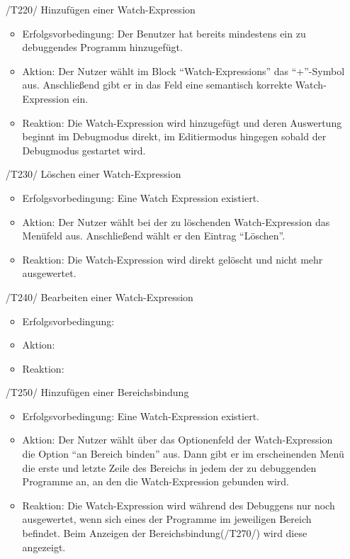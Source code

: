 \documentclass[parskip=full]{scrartcl}
\begin{document}
\begin{itemize}

	\item[/T220/] Hinzufügen einer \gls{Watch-Expression}
		\begin{itemize}
		\item Erfolgsvorbedingung: Der Benutzer hat bereits mindestens ein zu debuggendes Programm hinzugefügt.
		\item Aktion: Der Nutzer wählt im Block \enquote{Watch-Expressions} das \enquote{+}-Symbol aus. Anschließend gibt er in das Feld eine semantisch korrekte Watch-Expression ein.
		\item Reaktion:	Die Watch-Expression wird hinzugefügt und deren Auswertung beginnt im Debugmodus direkt, im Editiermodus hingegen sobald der Debugmodus gestartet wird.
		\end{itemize}	
	
	\item[/T230/] Löschen einer Watch-Expression
		\begin{itemize}
		\item Erfolgsvorbedingung: Eine Watch Expression existiert.
		\item Aktion: Der Nutzer wählt bei der zu löschenden Watch-Expression das Menüfeld aus. Anschließend wählt er den Eintrag \enquote{Löschen}.
		\item Reaktion:	Die Watch-Expression wird direkt gelöscht und nicht mehr ausgewertet.
		\end{itemize}	
	
	\item[/T240/] Bearbeiten einer Watch-Expression
		\begin{itemize}
		\item Erfolgsvorbedingung:
		\item Aktion:
		\item Reaktion:		
		\end{itemize}	
	
	\item[/T250/] Hinzufügen einer Bereichsbindung
		\begin{itemize}
		\item Erfolgsvorbedingung: Eine Watch-Expression existiert.
		\item Aktion: Der Nutzer wählt über das Optionenfeld der Watch-Expression die Option \enquote{an Bereich binden} aus. Dann gibt er im erscheinenden Menü die erste und letzte Zeile des Bereichs in jedem der zu debuggenden Programme an, an den die Watch-Expression gebunden wird. 
		\item Reaktion:	Die Watch-Expression wird während des Debuggens nur noch ausgewertet, wenn sich eines der Programme im jeweiligen Bereich befindet. Beim Anzeigen der Bereichsbindung(/T270/) wird diese angezeigt. 
		\end{itemize}	
	

\end{itemize}
\end{document}
